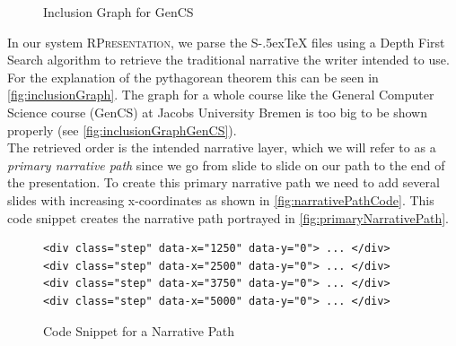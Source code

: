 \documentclass[twoside, 12pt]{article}
\def\stex{\texorpdfstring{\raisebox{-.5ex}S\kern-.5ex\TeX}{sTeX}\xspace}
\newcommand{\sys}{\textsc{RPresentation}\xspace}
\begin{document}
\newpage

\begin{figure}
\vspace{-28pt}
  \begin{center}
\vspace{-16pt}
  \caption{Inclusion Graph for GenCS}
  \label{fig:inclusionGraphGenCS}
\vspace{-24pt}
  \end{center}
\end{figure}

In our system \sys, we parse the \stex files using a Depth First Search algorithm to retrieve the traditional narrative the writer intended to use. For the explanation of the pythagorean theorem this can be seen in \autoref{fig:inclusionGraph}. The graph for a whole course like the General Computer Science course (GenCS) at Jacobs University Bremen \cite{Kohlhase:GenCSII:base} is too big to be shown properly (see \autoref{fig:inclusionGraphGenCS}).\\

The retrieved order is the intended narrative layer, which we will refer to as a \textit{primary narrative path} since we go from slide to slide on our path to the end of the presentation. To create this primary narrative path we need to add several slides with increasing x-coordinates as shown in \autoref{fig:narrativePathCode}. This code snippet creates the narrative path portrayed in \autoref{fig:primaryNarrativePath}.\\

\begin{figure}
\vspace{-26pt}
\begin{verbatim}
<div class="step" data-x="1250" data-y="0"> ... </div>
<div class="step" data-x="2500" data-y="0"> ... </div>
<div class="step" data-x="3750" data-y="0"> ... </div>
<div class="step" data-x="5000" data-y="0"> ... </div>
\end{verbatim}
\vspace{-5pt}
  \caption{Code Snippet for a Narrative Path}
  \label{fig:narrativePathCode}
  \vspace{12pt}
\end{figure}
\end{document}

